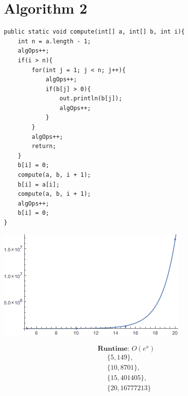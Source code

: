 \documentclass{hw}
\begin{document}
\newpage

\section*{Algorithm 2}


\begin{verbatim}
public static void compute(int[] a, int[] b, int i){
    int n = a.length - 1;
    algOps++;
    if(i > n){
        for(int j = 1; j < n; j++){
            algOps++;
            if(b[j] > 0){
                out.println(b[j]);
                algOps++;
            }
        }
        algOps++;
        return;
    }
    b[i] = 0;
    compute(a, b, i + 1);
    b[i] = a[i];
    compute(a, b, i + 1);
    algOps++;
    b[i] = 0;
}
\end{verbatim}

\vspace{2cm}
\begin{center}
\includegraphics[scale=0.6]{ag2}
\end{center}
\[
\textbf{Runtime: }O(e^x)
\]
\begin{align*}
&\{5, 149\},\\
&\{10, 8701\},\\
&\{15, 401405\},\\
&\{20, 16777213\}\\
\end{align*}
\end{document}
